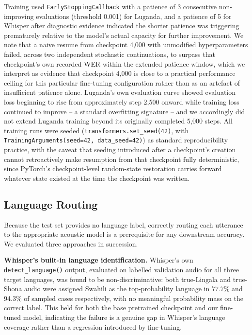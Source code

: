 \documentclass[11pt]{article}
\begin{document}
Training used \texttt{EarlyStoppingCallback} with a patience of 3 consecutive non-improving evaluations (threshold 0.001) for Luganda, and a patience of 5 for Whisper after diagnostic evidence indicated the shorter patience was triggering prematurely relative to the model's actual capacity for further improvement. We note that a naive resume from checkpoint 4{,}000 with unmodified hyperparameters failed, across two independent stochastic continuations, to surpass that checkpoint's own recorded WER within the extended patience window, which we interpret as evidence that checkpoint 4{,}000 is close to a practical performance ceiling for this particular fine-tuning configuration rather than as an artefact of insufficient patience alone. Luganda's own evaluation curve showed evaluation loss beginning to rise from approximately step 2{,}500 onward while training loss continued to improve -- a standard overfitting signature -- and we accordingly did not extend Luganda training beyond its originally completed 5{,}000 steps. All training runs were seeded (\texttt{transformers.set\_seed(42)}, with \texttt{TrainingArguments(seed=42, data\_seed=42)}) as standard reproducibility practice, with the caveat that seeding introduced after a checkpoint's creation cannot retroactively make resumption from that checkpoint fully deterministic, since PyTorch's checkpoint-level random-state restoration carries forward whatever state existed at the time the checkpoint was written.

\subsection{Language Routing}
\label{sec:routing}

Because the test set provides no language label, correctly routing each utterance to the appropriate acoustic model is a prerequisite for any downstream accuracy. We evaluated three approaches in succession.

\textbf{Whisper's built-in language identification.} Whisper's own \texttt{detect\_language()} output, evaluated on labelled validation audio for all three target languages, was found to be non-discriminative: both true-Lingala and true-Shona audio were assigned Swahili as the top-probability language in 77.7\% and 94.3\% of sampled cases respectively, with no meaningful probability mass on the correct label. This held for both the base pretrained checkpoint and our fine-tuned model, indicating the failure is a genuine gap in Whisper's language coverage rather than a regression introduced by fine-tuning.
\end{document}
